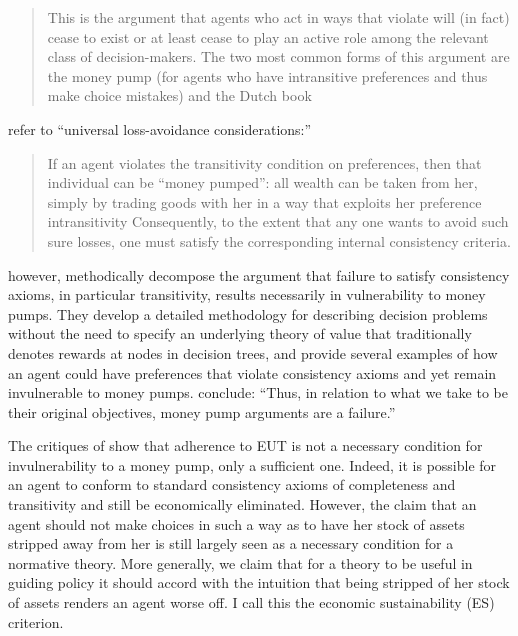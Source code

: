 \documentclass[../main.tex]{subfiles}
\begin{document}
\singlespacing
\blockquote{
This is the argument that agents who act in ways that violate  will (in fact) cease to exist or at least cease to play an active role among the relevant class of decision-makers.
The two most common forms of this argument are the money pump (for agents who have intransitive preferences and thus make choice mistakes) and the Dutch book\textelp{}
}
\doublespacing
\noindent \textcite[336]{Grune-Yanoff2014} refer to \enquote{universal loss-avoidance considerations:}
\singlespacing
\blockquote{
If an agent violates the transitivity condition on preferences, then that individual can be \enquote{money pumped}:
all wealth can be taken from her, simply by trading goods with her in a way that exploits her preference intransitivity\textelp{}
Consequently, to the extent that any one wants to avoid such sure losses, one must satisfy the corresponding internal consistency criteria.
}
\doublespacing

\textcite{Cubitt2001} however, methodically decompose the argument that failure to satisfy consistency axioms, in particular transitivity, results necessarily in vulnerability to money pumps.
They develop a detailed methodology for describing decision problems without the need to specify an underlying theory of value that traditionally denotes rewards at nodes in decision trees, and provide several examples of how an agent could have preferences that violate consistency axioms and yet remain invulnerable to money pumps.{\footnotemark}
\textcite[154]{Cubitt2001} conclude: \enquote{Thus, in relation to what we take to be their original objectives, money pump arguments are a failure.}

\addtocounter{footnote}{-1}

The critiques of \textcite{Cubitt2001} show that adherence to EUT is not a necessary condition for invulnerability to a money pump, only a sufficient one.
Indeed, it is possible for an agent to conform to standard consistency axioms of completeness and transitivity and still be economically eliminated.{\footnotemark}
However, the claim that an agent should not make choices in such a way as to have her stock of assets stripped away from her is still largely seen as a necessary condition for a normative theory.
More generally, we claim that for a theory to be useful in guiding policy it should accord with the intuition that being stripped of her stock of assets renders an agent worse off.{\footnotemark}
I call this the economic sustainability (ES) criterion.
\end{document}
